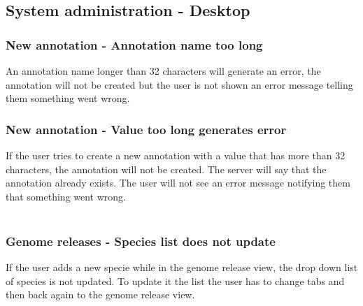 \subsection{System administration - Desktop}

\subsubsection{New annotation - Annotation name too long}
An annotation name longer than 32 characters will generate an error,
the annotation will not be created but the user is not shown an
error message telling them something went wrong.

\subsubsection{New annotation - Value too long generates error}
If the user tries to create a new annotation with a value that has
more than 32 characters, the annotation will not be created. The
server will say that the annotation already exists. The user will not
see an error message notifying them that something went wrong. \\
\\
\subsubsection{Genome releases - Species list does not update}
If the user adds a new specie while in the genome release view, the
drop down list of species is not updated. To update it the list the
user has to change tabs and then back again to the genome release view.


